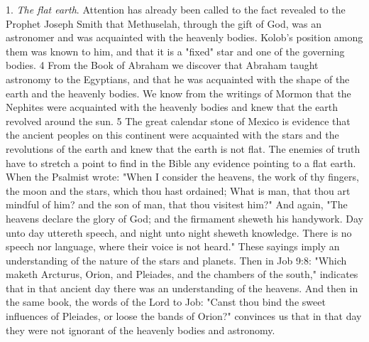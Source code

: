 1. \textit{The flat earth}. Attention has already been called to the fact revealed to the Prophet Joseph
Smith that Methuselah, through the gift of God, was an astronomer and was acquainted with
the heavenly bodies. Kolob's position among them was known to him, and that it is a "fixed"
star and one of the governing bodies. 4 From the Book of Abraham we discover that
Abraham taught astronomy to the Egyptians, and that he was acquainted with the shape of
the earth and the heavenly bodies. We know from the writings of Mormon that the Nephites
were acquainted with the heavenly bodies and knew that the earth revolved around the sun. 5
The great calendar stone of Mexico is evidence that the ancient peoples on this continent
were acquainted with the stars and the revolutions of the earth and knew that the earth is not
flat. The enemies of truth have to stretch a point to find in the Bible any evidence pointing to
a flat earth. When the Psalmist wrote: "When I consider the heavens, the work of thy fingers,
the moon and the stars, which thou hast ordained; What is man, that thou art mindful of him?
and the son of man, that thou visitest him?" And again, "The heavens declare the glory of
God; and the firmament sheweth his handywork. Day unto day uttereth speech, and night
unto night sheweth knowledge. There is no speech nor language, where their voice is not
heard." These sayings imply an understanding of the nature of the stars and planets. Then in
Job 9:8: "Which maketh Arcturus, Orion, and Pleiades, and the chambers of the south,"
indicates that in that ancient day there was an understanding of the heavens. And then in the
same book, the words of the Lord to Job: "Canst thou bind the sweet influences of Pleiades,
or loose the bands of Orion?" convinces us that in that day they were not ignorant of the
heavenly bodies and astronomy.

